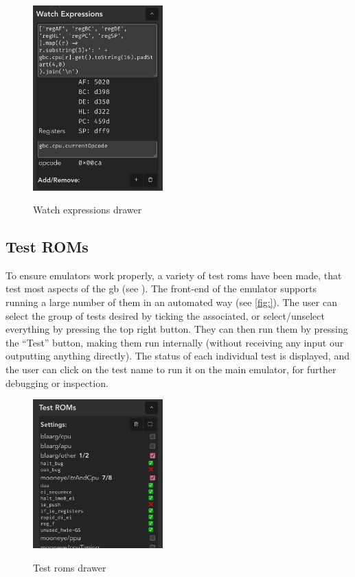 \documentclass[11pt]{informatics-report}
\begin{document}
\begin{figure}[h]
    \centering
    \includegraphics[width=5cm]{images/watch-expressions}\\
    \caption{Watch expressions drawer}
    \label{fig:watch-expressions}
\end{figure}

\subsection{Test ROMs}
\label{sec:testing-ui}

To ensure emulators work properly, a variety of test \glspl{rom} have been made, that test most aspects of the \gls{gb} (see ). The front-end of the emulator supports running a large number of them in an automated way (see \ref{fig:}). The user can select the group of tests desired by ticking the associated, or select/unselect everything by pressing the top right button. They can then run them by pressing the ``Test'' button, making them run internally (without receiving any input our outputting anything directly). The status of each individual test is displayed, and the user can click on the test name to run it on the main emulator, for further debugging or inspection.

\begin{figure}[h]
    \centering
    \includegraphics[width=5cm]{images/test-roms}\\
    \caption{Test \glspl{rom} drawer}
    \label{fig:watch-expressions}
\end{figure}
\end{document}
